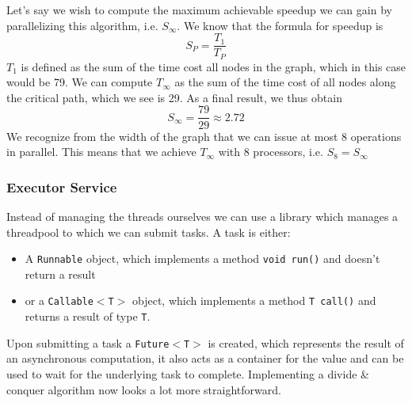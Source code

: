 \documentclass[main.tex]{subfiles}
\begin{document}
\begin{example}
\begin{center}
    \end{center}
    Let's say we wish to compute the maximum achievable speedup we can gain by parallelizing this algorithm, i.e. $S_\infty$. We know that the formula for speedup is
    \begin{equation*}
        S_P = \frac{T_1}{T_P}
    \end{equation*}
    $T_1$ is defined as the sum of the time cost all nodes in the graph, which in this case would be 79.  We can compute $T_\infty$ as the sum of the time cost of all nodes along the critical path, which we see is 29. As a final result, we thus obtain
    \begin{equation*}
        S_\infty = \frac{79}{29} \approx 2.72
    \end{equation*}
    We recognize from the width of the graph that we can issue at most 8 operations in parallel. This means that we achieve $T_\infty$ with 8 processors, i.e. $S_8 = S_\infty$
\end{example}


\subsubsection{Executor Service} \label{Executor Service}
Instead of managing the threads ourselves we can use a library which manages a threadpool to which we can submit tasks. A task is either:
\begin{itemize}
    \item A \texttt{Runnable} object, which implements a method \texttt{void run()} and doesn't return a result
    \item or a \texttt{Callable$<$T$>$} object, which implements a method \texttt{T call()} and returns a result of type \texttt{T}.
\end{itemize}
Upon submitting a task a \texttt{Future$<$T$>$} is created, which represents the result of an asynchronous computation, it also acts as a container for the value and can be used to wait for the underlying task to complete. Implementing a divide \& conquer algorithm now looks a lot more straightforward.

\newpage
\end{document}
